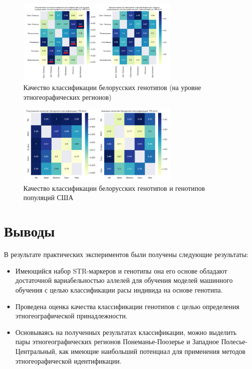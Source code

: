 \begin{figure}[h]
\begin{center}
\includegraphics[width=8cm]{images/bel_pr.png}
\end{center}
  \caption{Качество классификации белорусских генотипов (на уровне этногеорафических регионов)}
  \label{image:bel_pr}
\end{figure}

\begin{figure}[h]
\begin{center}
\includegraphics[width=8cm]{images/us_pr.png}
\end{center}
  \caption{Качество классификации белорусских генотипов и генотипов популяций США}
  \label{image:us_pr}
\end{figure}

\section{Выводы}

В результате практических экспериментов были получены следующие результаты:
\begin{itemize}
\item Имеющийся набор STR-маркеров и генотипы она его основе обладают достаточной вариабельностью аллелей
для обучения моделей машинного обучения с целью классификации расы индивида на основе генотипа.

\item Проведена оценка качества классификации генотипов с целью определения этногеографической принадлежности.

\item Основываясь на полученных результатах классификации, можно выделить пары этногеографических регионов
Понеманье-Поозерье и Западное Полесье-Центральный, как имеющие наибольший потенциал для применения методов
этногеорафической идентификации.
\end{itemize}
